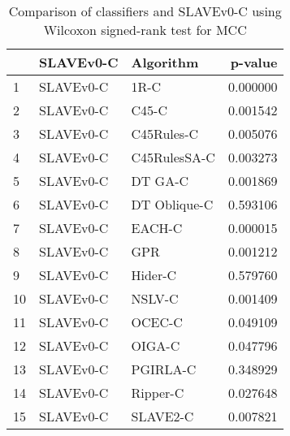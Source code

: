 \begin{table}
\footnotesize
\caption{Comparison of classifiers and SLAVEv0-C using Wilcoxon signed-rank test for MCC}
\label{tab:SLAVEv0-C wilcoxon MCC comparison}
\begin{tabular}{lllr}
\hline
 & SLAVEv0-C & Algorithm & p-value \\
\hline
1 & SLAVEv0-C & 1R-C & 0.000000 \\
2 & SLAVEv0-C & C45-C & 0.001542 \\
3 & SLAVEv0-C & C45Rules-C & 0.005076 \\
4 & SLAVEv0-C & C45RulesSA-C & 0.003273 \\
5 & SLAVEv0-C & DT GA-C & 0.001869 \\
6 & SLAVEv0-C & DT Oblique-C & 0.593106 \\
7 & SLAVEv0-C & EACH-C & 0.000015 \\
8 & SLAVEv0-C & GPR & 0.001212 \\
9 & SLAVEv0-C & Hider-C & 0.579760 \\
10 & SLAVEv0-C & NSLV-C & 0.001409 \\
11 & SLAVEv0-C & OCEC-C & 0.049109 \\
12 & SLAVEv0-C & OIGA-C & 0.047796 \\
13 & SLAVEv0-C & PGIRLA-C & 0.348929 \\
14 & SLAVEv0-C & Ripper-C & 0.027648 \\
15 & SLAVEv0-C & SLAVE2-C & 0.007821 \\
\hline
\end{tabular}
\end{table}
